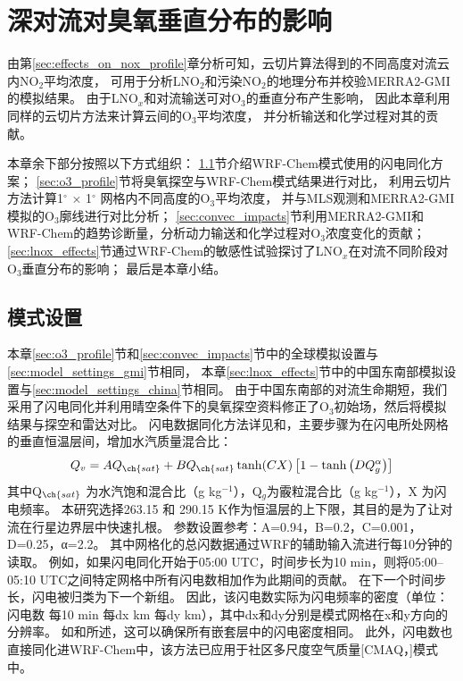 
\chapter{深对流对臭氧垂直分布的影响}

由第\ref{sec:effects_on_nox_profile}章分析可知，云切片算法得到的不同高度对流云内NO$_2$平均浓度，
可用于分析LNO$_2$和污染NO$_2$的地理分布并校验MERRA2-GMI的模拟结果。
由于LNO$_x$和对流输送可对O$_3$的垂直分布产生影响，
因此本章利用同样的云切片方法来计算云间的O$_3$平均浓度，
并分析输送和化学过程对其的贡献。

本章余下部分按照以下方式组织：
\ref{sec:model_settings_assimilation}节介绍WRF-Chem模式使用的闪电同化方案；
\ref{sec:o3_profile}节将臭氧探空与WRF-Chem模式结果进行对比，
利用云切片方法计算1$^{\circ}$ $\times$ 1$^{\circ}$ 网格内不同高度的O$_3$平均浓度，
并与MLS观测和MERRA2-GMI模拟的O$_3$廓线进行对比分析；
\ref{sec:convec_impacts}节利用MERRA2-GMI和WRF-Chem的趋势诊断量，分析动力输送和化学过程对O$_3$浓度变化的贡献；
\ref{sec:lnox_effects}节通过WRF-Chem的敏感性试验探讨了LNO$_x$在对流不同阶段对O$_3$垂直分布的影响；
最后是本章小结。


\section{模式设置} \label{sec:model_settings_assimilation}

本章\ref{sec:o3_profile}节和\ref{sec:convec_impacts}节中的全球模拟设置与\ref{sec:model_settings_gmi}节相同，
本章\ref{sec:lnox_effects}节中的中国东南部模拟设置与\ref{sec:model_settings_china}节相同。
由于中国东南部的对流生命期短，我们采用了闪电同化并利用晴空条件下的臭氧探空资料修正了O$_3$初始场，然后将模拟结果与探空和雷达对比。
闪电数据同化方法详见\citet{Fierro.2012}和\citet{Li.2017b}，主要步骤为在闪电所处网格的垂直恒温层间，增加水汽质量混合比：
\begin{equation} \label{eq:lda}
Q_{v}=A Q_{\ch{sat}}+B Q_{\ch{sat}} \tanh (C X)\left[1-\tanh \left(D Q_{g}^{\alpha}\right)\right]
\end{equation}
其中Q$_{\ch{sat}}$ 为水汽饱和混合比（g kg$^{−1}$），Q$_g$为霰粒混合比（g kg$^{−1}$），X 为闪电频率。
本研究选择263.15 和 290.15 K作为恒温层的上下限，其目的是为了让对流在行星边界层中快速扎根\citep{Marchand.2014,Finney.2016,Li.2017b}。
参数设置参考\citet{Li.2017b}：A=0.94，B=0.2，C=0.001，D=0.25，α=2.2。
其中网格化的总闪数据通过WRF的辅助输入流进行每10分钟的读取。
例如，如果闪电同化开始于05:00 UTC，时间步长为10 min，则将05:00--05:10 UTC之间特定网格中所有闪电数相加作为此期间的贡献。
在下一个时间步长，闪电被归类为下一个新组。
因此，该闪电数实际为闪电频率的密度（单位：闪电数 每10 min 每dx km 每dy km），其中dx和dy分别是模式网格在x和y方向的分辨率。
如\citet{Fierro.2012}和\citet{Li.2017b}所述，这可以确保所有嵌套层中的闪电密度相同。
此外，闪电数也直接同化进WRF-Chem中，该方法已应用于社区多尺度空气质量[CMAQ，\citet{Kang.2019a,Kang.2019,Kang.2020}]模式中。


